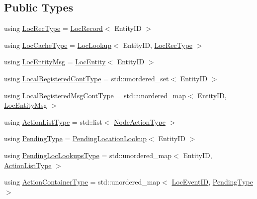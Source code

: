 \subsection*{Public Types}
\begin{DoxyCompactItemize}
\item 
using \hyperlink{structvt_1_1location_1_1_entity_location_coord_a685f9eee868b7b9e01072a5b303548bc}{Loc\+Rec\+Type} = \hyperlink{structvt_1_1location_1_1_loc_record}{Loc\+Record}$<$ Entity\+ID $>$
\item 
using \hyperlink{structvt_1_1location_1_1_entity_location_coord_a8824e120b11c3234534a6dce11fe0c69}{Loc\+Cache\+Type} = \hyperlink{structvt_1_1location_1_1_loc_lookup}{Loc\+Lookup}$<$ Entity\+ID, \hyperlink{structvt_1_1location_1_1_entity_location_coord_a685f9eee868b7b9e01072a5b303548bc}{Loc\+Rec\+Type} $>$
\item 
using \hyperlink{structvt_1_1location_1_1_entity_location_coord_ab0db07ed0b9f75712922733dd467b100}{Loc\+Entity\+Msg} = \hyperlink{structvt_1_1location_1_1_loc_entity}{Loc\+Entity}$<$ Entity\+ID $>$
\item 
using \hyperlink{structvt_1_1location_1_1_entity_location_coord_a90aee70e2e80fe4c1abf1d0616113708}{Local\+Registered\+Cont\+Type} = std\+::unordered\+\_\+set$<$ Entity\+ID $>$
\item 
using \hyperlink{structvt_1_1location_1_1_entity_location_coord_a0c6d24fed6c690ac6d044b11d884df65}{Local\+Registered\+Msg\+Cont\+Type} = std\+::unordered\+\_\+map$<$ Entity\+ID, \hyperlink{structvt_1_1location_1_1_entity_location_coord_ab0db07ed0b9f75712922733dd467b100}{Loc\+Entity\+Msg} $>$
\item 
using \hyperlink{structvt_1_1location_1_1_entity_location_coord_a093712fbaa7584cb35db2b33514a719a}{Action\+List\+Type} = std\+::list$<$ \hyperlink{namespacevt_1_1location_a3a9235e0ceb341bef225d2cc46606e9e}{Node\+Action\+Type} $>$
\item 
using \hyperlink{structvt_1_1location_1_1_entity_location_coord_a41b5c3792967e089c7e592b705c266c3}{Pending\+Type} = \hyperlink{structvt_1_1location_1_1_pending_location_lookup}{Pending\+Location\+Lookup}$<$ Entity\+ID $>$
\item 
using \hyperlink{structvt_1_1location_1_1_entity_location_coord_a495c5dfc3aa444524af9aede4b20cfdc}{Pending\+Loc\+Lookups\+Type} = std\+::unordered\+\_\+map$<$ Entity\+ID, \hyperlink{structvt_1_1location_1_1_entity_location_coord_a093712fbaa7584cb35db2b33514a719a}{Action\+List\+Type} $>$
\item 
using \hyperlink{structvt_1_1location_1_1_entity_location_coord_afeaaebfc1d7cbdd20cccbd348d96748a}{Action\+Container\+Type} = std\+::unordered\+\_\+map$<$ \hyperlink{namespacevt_1_1location_aa5ccc1a42aa22b0b41fcfbbdee314dca}{Loc\+Event\+ID}, \hyperlink{structvt_1_1location_1_1_entity_location_coord_a41b5c3792967e089c7e592b705c266c3}{Pending\+Type} $>$

\end{DoxyCompactItemize}
